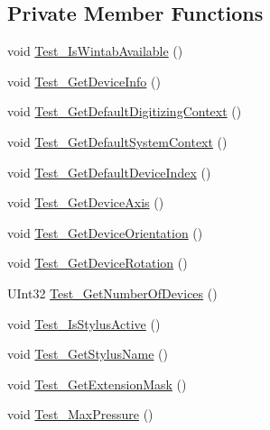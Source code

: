 \subsection*{Private Member Functions}
\begin{DoxyCompactItemize}
\item 
void \mbox{\hyperlink{class_paint___program_1_1_tablet_info_a57837c298e04350bc3611b0ed093ee8c}{Test\+\_\+\+Is\+Wintab\+Available}} ()
\item 
void \mbox{\hyperlink{class_paint___program_1_1_tablet_info_a7fc19fda1a1444bdc4229a10c7018599}{Test\+\_\+\+Get\+Device\+Info}} ()
\item 
void \mbox{\hyperlink{class_paint___program_1_1_tablet_info_a508f66e245bce37ffd182f0ba180bfeb}{Test\+\_\+\+Get\+Default\+Digitizing\+Context}} ()
\item 
void \mbox{\hyperlink{class_paint___program_1_1_tablet_info_a6dfaef8dbc743bfbffab4a2cf3f13087}{Test\+\_\+\+Get\+Default\+System\+Context}} ()
\item 
void \mbox{\hyperlink{class_paint___program_1_1_tablet_info_ac5bb83e6ba49dfb4a6522d67e5553819}{Test\+\_\+\+Get\+Default\+Device\+Index}} ()
\item 
void \mbox{\hyperlink{class_paint___program_1_1_tablet_info_a8a9237e85de0f55296d5f0098eec9ec8}{Test\+\_\+\+Get\+Device\+Axis}} ()
\item 
void \mbox{\hyperlink{class_paint___program_1_1_tablet_info_ab4f7f782ed10c11ee9ae2c574ba33ca0}{Test\+\_\+\+Get\+Device\+Orientation}} ()
\item 
void \mbox{\hyperlink{class_paint___program_1_1_tablet_info_ad9df50108fcb977ee9e1e36b9e4c0220}{Test\+\_\+\+Get\+Device\+Rotation}} ()
\item 
U\+Int32 \mbox{\hyperlink{class_paint___program_1_1_tablet_info_ae53a72d08d3fcc6891f5e39d94f91b97}{Test\+\_\+\+Get\+Number\+Of\+Devices}} ()
\item 
void \mbox{\hyperlink{class_paint___program_1_1_tablet_info_a02866892ffb797cdc49c030bd72cbac1}{Test\+\_\+\+Is\+Stylus\+Active}} ()
\item 
void \mbox{\hyperlink{class_paint___program_1_1_tablet_info_aab8b9141d7d24e97ba6a4cb71af0f481}{Test\+\_\+\+Get\+Stylus\+Name}} ()
\item 
void \mbox{\hyperlink{class_paint___program_1_1_tablet_info_a065e2f91a52ee65c40da83cefd33b796}{Test\+\_\+\+Get\+Extension\+Mask}} ()
\item 
void \mbox{\hyperlink{class_paint___program_1_1_tablet_info_a7856382bc542b2a4f8c5bebda8dc588a}{Test\+\_\+\+Max\+Pressure}} ()

\end{DoxyCompactItemize}
